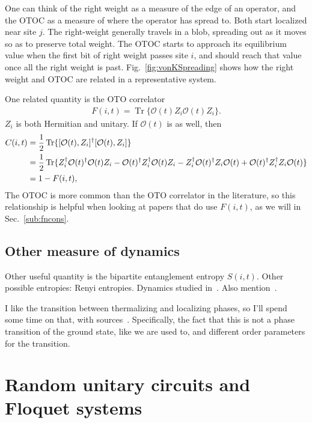 \documentclass[a4paper,11pt]{article}
\renewcommand{\cal}{\mathcal}
\newcommand{\half}{\frac{1}{2}}
\newcommand{\nn}{\nonumber\\}
\newcommand{\note}[1]{{\color{red}{#1}}}
\DeclareMathOperator{\Tr}{Tr}
\let\Re\relax
\DeclareMathOperator{\Re}{Re}
\begin{document}
One can think of the right weight as a measure of the edge of an operator, and the OTOC as a measure of where the operator has spread to. Both start localized near site $j$. The right-weight generally travels in a blob, spreading out as it moves so as to preserve total weight. The OTOC starts to approach its equilibrium value when the first bit of right weight passes site $i$, and should reach that value once all the right weight is past.
Fig.~\ref{fig:vonKSpreading} shows how the right weight and OTOC are related in a representative system.

One related quantity is the OTO correlator 
\begin{align}
F(i,t) = \Tr\{\cal{O}(t) Z_i\cal{O}(t) Z_i\}.
\end{align}
$Z_i$ is both Hermitian and unitary. If $\cal{O}(t)$ is as well, then
\begin{align}
C(i,t) &= \half \Tr \{[\cal{O}(t), Z_i]^\dag [\cal{O}(t), Z_i] \}\nn
&= \half \Tr\{Z_i^\dag \cal{O}(t)^\dag \cal{O}(t) Z_i - \cal{O}(t)^\dag Z_i^\dag \cal{O}(t) Z_i - Z_i^\dag \cal{O}(t)^\dag Z_i \cal{O}(t) + \cal{O}(t)^\dag Z_i^\dag Z_i \cal{O}(t) \} \nn
&= 1-\Re F(i,t), \label{eqn:OTOCOTO}
\end{align}
The OTOC is more common than the OTO correlator in the literature, so this relationship is helpful when looking at papers that do use $F(i,t)$, as we will in Sec.~\ref{sub:fncons}.

\subsection{Other measure of dynamics} \label{sub:other}

\note{Is any of this useful or necessary?}
Other useful quantity is the bipartite entanglement entropy $S(i,t)$.
Other possible entropies: Renyi entropies.
Dynamics studied in~\cite{RakovskyDiff, HuangRenyi}.
Also mention~\cite{JonayEntanglement}.

I like the transition between thermalizing and localizing phases, so I'll spend some time on that, with sources~\cite{PalHuse, KhemaniCP}. Specifically, the fact that this is not a phase transition of the ground state, like we are used to, and different order parameters for the transition. 


\section{Random unitary circuits and Floquet systems} \label{sec:circuits}
\end{document}
